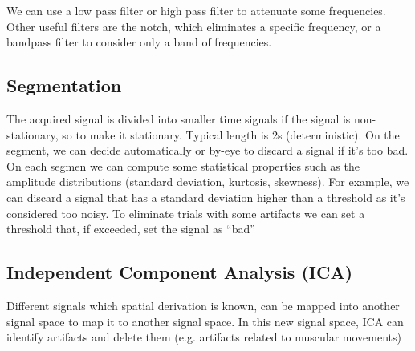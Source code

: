  We can use a low pass filter or high pass filter to attenuate some frequencies. Other useful filters are the notch, which eliminates a specific frequency, or a bandpass filter to consider only a band of frequencies.

 \subsection{Segmentation}
 The acquired signal is divided into smaller time signals if the signal is non-stationary, so to make it stationary. Typical length is 2s (deterministic). On the segment, we can decide automatically or by-eye to discard a signal if it's too bad. On each segmen we can compute some statistical properties such as the amplitude distributions (standard deviation, kurtosis, skewness). For example, we can discard a signal that has a standard deviation higher than a threshold as it's considered too noisy. To eliminate trials with some artifacts we can set a threshold that, if exceeded, set the signal as ``bad''

 \subsection{Independent Component Analysis (ICA)}
 Different signals which spatial derivation is known, can be mapped into another signal space to map it to another signal space. In this new signal space, ICA can identify artifacts and delete them (e.g. artifacts related to muscular movements)
